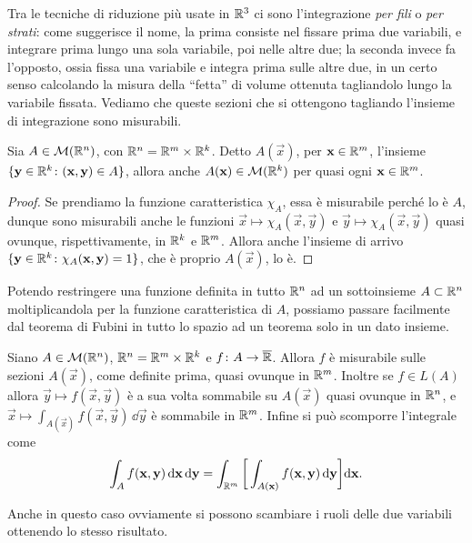 Tra le tecniche di riduzione più usate in $\mathbb{R}^3$ ci sono l'integrazione \emph{per fili} o \emph{per strati}: come suggerisce il nome, la prima consiste nel fissare prima due variabili, e integrare prima lungo una sola variabile, poi nelle altre due; la seconda invece fa l'opposto, ossia fissa una variabile e integra prima sulle altre due, in un certo senso calcolando la misura della ``fetta'' di volume ottenuta tagliandolo lungo la variabile fissata.
Vediamo che queste sezioni che si ottengono tagliando l'insieme di integrazione sono misurabili.
\begin{lemma} \label{l:sezioni-misurabili}
	Sia $A\in\mathcal M(\mathbb{R}^n)$, con $\mathbb{R}^n=\mathbb{R}^m\times\mathbb{R}^k$.
	Detto $A(\vec x)$, per $\mathbf{x}\in\mathbb{R}^m$, l'insieme $\{\mathbf{y}\in\mathbb{R}^k\colon(\mathbf{x},\mathbf{y})\in A\}$, allora anche $A(\mathbf{x})\in\mathcal M(\mathbb{R}^k)$ per quasi ogni $\mathbf{x}\in\mathbb{R}^m$.
\end{lemma}
\begin{proof}
	Se prendiamo la funzione caratteristica $\chi_A$, essa è misurabile perch\'e lo è $A$, dunque sono misurabili anche le funzioni $\vec x\mapsto\chi_A(\vec x,\vec y)$ e $\vec y\mapsto\chi_A(\vec x,\vec y)$ quasi ovunque, rispettivamente, in $\mathbb{R}^k$ e $\mathbb{R}^m$.
	Allora anche l'insieme di arrivo $\{\mathbf{y}\in\mathbb{R}^k\colon\chi_A(\mathbf{x},\mathbf{y})=1\}$, che è proprio $A(\vec x)$, lo è.
\end{proof}
Potendo restringere una funzione definita in tutto $\mathbb{R}^n$ ad un sottoinsieme $A\subset\mathbb{R}^n$ moltiplicandola per la funzione caratteristica di $A$, possiamo passare facilmente dal teorema di Fubini in tutto lo spazio ad un teorema solo in un dato insieme.
\begin{teorema} \label{t:fubini2}
	Siano $A\in\mathcal M(\mathbb{R}^n)$, $\mathbb{R}^n=\mathbb{R}^m\times\mathbb{R}^k$ e $f\colon A\to\overline{\mathbb{R}}$.
	Allora $f$ è misurabile sulle sezioni $A(\vec x)$, come definite prima, quasi ovunque in $\mathbb{R}^m$.
	Inoltre se $f\in L(A)$ allora $\vec y\mapsto f(\vec x,\vec y)$ è a sua volta sommabile su $A(\vec x)$ quasi ovunque in $\mathbb{R}^n$, e $\vec x\mapsto\int_{A(\vec x)}f(\vec x,\vec y)\,\dd\vec y$ è sommabile in $\mathbb{R}^m$.
	Infine si può scomporre l'integrale come
	\begin{equation}
		\int_Af(\mathbf{x},\mathbf{y})\,\textup{d}\mathbf{x}\,\textup{d}\mathbf{y}=\int_{\mathbb{R}^m}\bigg[\int_{A(\mathbf{x})}f(\mathbf{x},\mathbf{y})\,\textup{d}\mathbf{y}\bigg]\textup{d}\mathbf{x}.
	\end{equation}
\end{teorema}
Anche in questo caso ovviamente si possono scambiare i ruoli delle due variabili ottenendo lo stesso risultato.

